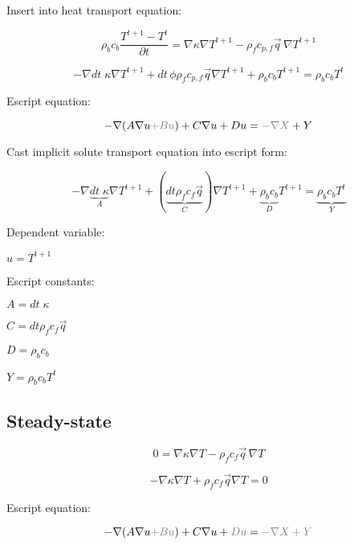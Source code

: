 \documentclass[11pt]{article}
\begin{document}
Insert into heat transport equation:

\begin{equation}
	\rho _b c_b \frac { T^{t+1} - T^t} {\partial t} = \nabla \kappa \nabla T^{t+1} - \rho_{f} c_{p,f} \vec q \, \nabla T^{t+1}
\end{equation}

\begin{equation}
    - \nabla dt \; \kappa \nabla T^{t+1} + dt \, \phi  \rho_{f} c_{p,f} \vec{q} \nabla T^{t+1} + \rho_b c_b T^{t+1}  =  \rho_b c_b T^t 
\end{equation}


Escript equation:

\begin{equation}
     - \nabla (A \nabla u {\color{gray}+ B u }) + C \nabla u + D u  = {\color{gray}- \nabla X } + Y
\end{equation}

Cast implicit solute transport equation into escript form:

\begin{equation}
    - \nabla \underbrace{ dt \; \kappa}_A \nabla T^{t+1} + ( \underbrace{ dt \rho_f c_f \vec{q}}_C ) \nabla T^{t+1} + \underbrace{\rho_b c_b}_D T^{t+1}  =  \underbrace{\rho_b c_b T^t}_Y
\end{equation}

Dependent variable:

$ u = T^{t+1} $

Escript constants:

$ A = dt \; \kappa $

$ C = dt \rho_f c_f \vec{q} $

$ D = \rho_b c_b $

$ Y = \rho_b c_b T^t$

\subsection{Steady-state}


\begin{equation}
0 = \nabla \kappa \nabla T - \rho_{f} c_f \vec q \, \nabla T
\end{equation}

\begin{equation}
    - \nabla \kappa \nabla T + \rho_{f} c_f \vec{q} \nabla T  =  0 
\end{equation}


Escript equation:

\begin{equation}
     - \nabla (A \nabla u {\color{gray}+ B u }) + C \nabla u + {\color{gray}D u}  = {\color{gray}- \nabla X  + Y}
\end{equation}
\end{document}
